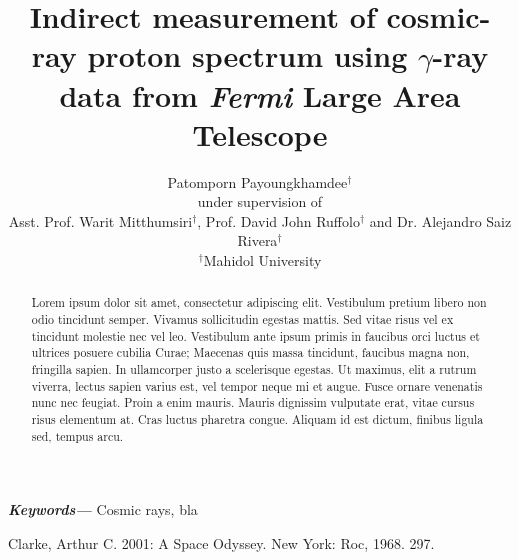 \documentclass[a4paper]{article}
\title{Indirect measurement of cosmic-ray proton spectrum using $\gamma$-ray data from {\it Fermi} Large Area Telescope}
\author{Patomporn Payoungkhamdee$^{\dagger}$\\
        under supervision of\\
        Asst. Prof. Warit Mitthumsiri$^{\dagger}$, Prof. David John Ruffolo$^{\dagger}$ and Dr. Alejandro Saiz Rivera$^{\dagger}$ \\
        \small $^{\dagger}$Mahidol University
}
\date{} %
\providecommand{\keywords}[1]
{
  \small	
  \textbf{\textit{Keywords---}} #1
}
\begin{document}
\maketitle

\begin{abstract}
Lorem ipsum dolor sit amet, consectetur adipiscing elit. Vestibulum pretium libero non odio tincidunt semper. Vivamus sollicitudin egestas mattis. Sed vitae risus vel ex tincidunt molestie nec vel leo. Vestibulum ante ipsum primis in faucibus orci luctus et ultrices posuere cubilia Curae; Maecenas quis massa tincidunt, faucibus magna non, fringilla sapien. In ullamcorper justo a scelerisque egestas. Ut maximus, elit a rutrum viverra, lectus sapien varius est, vel tempor neque mi et augue. Fusce ornare venenatis nunc nec feugiat. Proin a enim mauris. Mauris dignissim vulputate erat, vitae cursus risus elementum at. Cras luctus pharetra congue. Aliquam id est dictum, finibus ligula sed, tempus arcu. 
\end{abstract} \hspace{10pt}

\keywords{Cosmic rays, bla}
\begin{thebibliography}{00}
 Clarke, Arthur C. 2001: A Space Odyssey. New York: Roc, 1968. 297.
\end{thebibliography}


\end{document}
